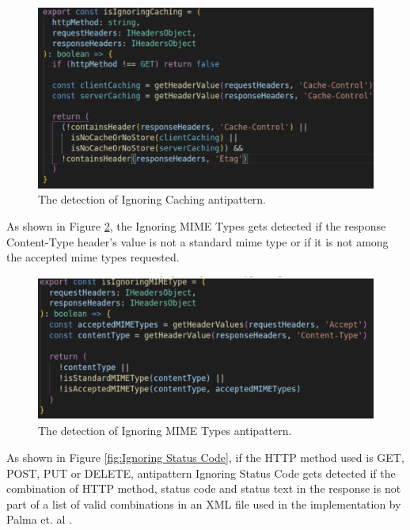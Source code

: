 \documentclass[a4paper,12pt]{article}
\begin{document}
\begin{figure}[h!]
    \centering
    \includegraphics[keepaspectratio,scale=0.8]{Template_report_LaTeX_EN/img/ignoringCaching.png}
    \caption{The detection of Ignoring Caching antipattern.}
    \label{fig:Ignoring Caching}
\end{figure}

As shown in Figure \ref{fig:Ignoring MIME Types}, the Ignoring MIME Types gets detected if the response Content-Type header's value is not a standard mime type or if it is not among the accepted mime types requested.

\begin{figure}[h!]
    \centering
    \includegraphics[keepaspectratio,scale=0.8]{Template_report_LaTeX_EN/img/ignoringMimeType.png}
    \caption{The detection of Ignoring MIME Types antipattern.}
    \label{fig:Ignoring MIME Types}
\end{figure}

As shown in Figure \ref{fig:Ignoring Status Code}, if the HTTP method used is GET, POST, PUT or DELETE, antipattern Ignoring Status Code gets detected if the combination of HTTP method, status code and status text in the response is not part of a list of valid combinations in an XML file used in the implementation by Palma et. al \cite{linguistic}.
\end{document}

